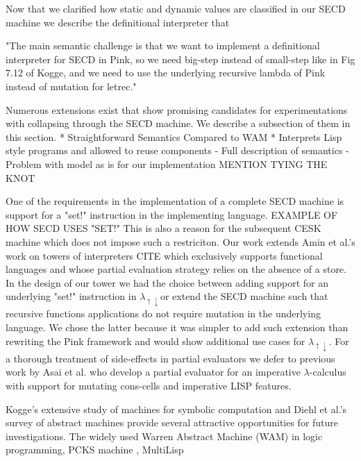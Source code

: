 \documentclass[fleqn]{article}
\theoremstyle{definition}
\newcommand{\mslang}{$\lambda_{\uparrow\downarrow}$}
\begin{document}
Now that we clarified how static and dynamic values are classified in our SECD machine we describe the definitional interpreter that 

"The main semantic challenge is that we want to implement a definitional interpreter for SECD in Pink, so we need big-step instead of small-step like in Fig 7.12 of Kogge, and we need to use the underlying recursive lambda of Pink instead of mutation for letrec."

Numerous extensions exist that show promising candidates for experimentations with collapsing through the SECD machine. We describe a subsection of them in this section.
	* Straightforward Semantics Compared to WAM
	* Interprets Lisp style programs and allowed to reuse components
- Full description of semantics
- Problem with model as is for our implementation
MENTION TYING THE KNOT

One of the requirements in the implementation of a complete SECD machine is support for a "set!" instruction in the implementing language. EXAMPLE OF HOW SECD USES "SET!" This is also a reason for the subsequent CESK machine which does not impose such a restriciton. Our work extends Amin et al.'s work on towers of interpreters CITE which exclusively supports functional languages and whose partial evaluation strategy relies on the absence of a store. In the design of our tower we had the choice between adding support for an underlying "set!" instruction in \mslang or extend the SECD machine such that recursive functions applications do not require mutation in the underlying language. We chose the latter because it was simpler to add such extension than rewriting the Pink framework and would show additional use cases for \mslang. For a thorough treatment of side-effects in partial evaluators we defer to previous work by Asai et al. who develop a partial evaluator for an imperative $\lambda$-calculus with support for mutating cons-cells and imperative LISP features.

Kogge's extensive study of machines for symbolic computation \cite{kogge1990architecture} and Diehl et al.'s survey of abstract machines provide several attractive opportunities for future investigations. The widely used Warren Abstract Machine (WAM) in logic programming, PCKS machine \cite{moreau1994pcks}, MultiLisp

\end{document}
